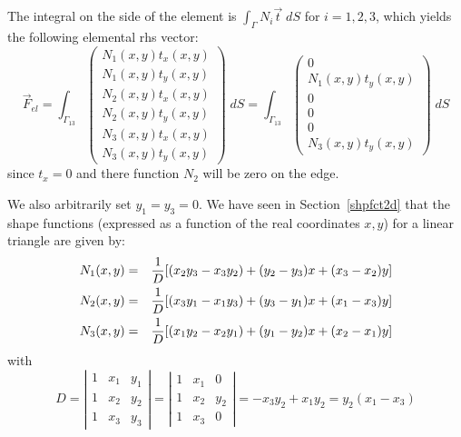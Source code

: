 The integral on the side of the element is $\int_\Gamma N_i {\vec t} \; dS$
for $i=1,2,3$, which yields the following elemental rhs vector:
\[
\vec{F}_{el}=
\int_{\Gamma_{13}} 
\left(
\begin{array}{c}
N_1(x,y) t_x(x,y)\\
N_1(x,y) t_y(x,y)\\
N_2(x,y) t_x(x,y)\\
N_2(x,y) t_y(x,y)\\
N_3(x,y) t_x(x,y)\\
N_3(x,y) t_y(x,y)
\end{array}
\right)
\; dS
=
\int_{\Gamma_{13}} 
\left(
\begin{array}{c}
0\\
N_1(x,y) t_y(x,y)\\
0\\
0\\
0\\
N_3(x,y) t_y(x,y)
\end{array}
\right)
\; dS
\]
since $t_x=0$ and there function $N_2$ will be zero on the edge.

We also arbitrarily set $y_1=y_3=0$. We have seen in Section~\ref{shpfct2d} that 
the shape functions (expressed as a function of the real coordinates $x,y$) 
for a linear triangle are given by:
\begin{eqnarray}
N_1(x,y) &=& \frac{1}{D}[(x_2y_3-x_3y_2) + (y_2-y_3)x + (x_3-x_2)y] \nonumber\\
N_2(x,y) &=& \frac{1}{D}[(x_3y_1-x_1y_3) + (y_3-y_1)x + (x_1-x_3)y] \nonumber\\
N_3(x,y) &=& \frac{1}{D}[(x_1y_2-x_2y_1) + (y_1-y_2)x + (x_2-x_1)y] \nonumber
\end{eqnarray}
with 
\[
D = 
\left|
\begin{array}{ccc}
1 & x_1 & y_1 \\
1 & x_2 & y_2 \\
1 & x_3 & y_3 
\end{array}
\right|
=
\left|
\begin{array}{ccc}
1 & x_1 & 0 \\
1 & x_2 & y_2 \\
1 & x_3 & 0 
\end{array}
\right|
=
-x_3y_2+x_1y_2
= y_2(x_1-x_3)
\]



